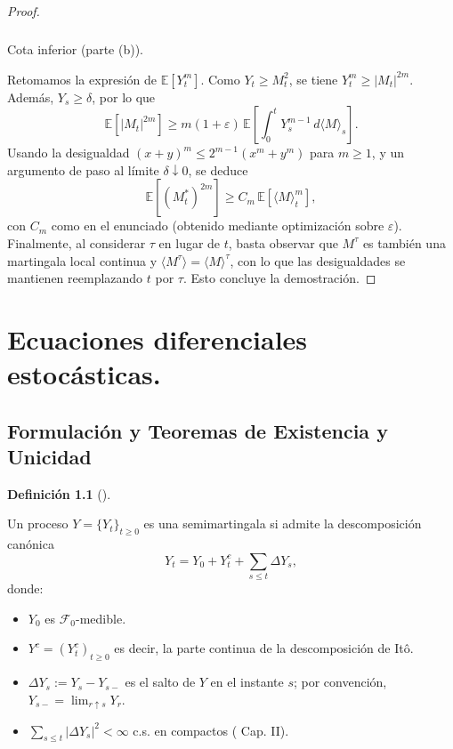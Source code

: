 \documentclass[
  spanish,
  us-letterpaper,
]{scrreprt}
\makeatletter
\let\oldparagraph\paragraph
\renewcommand{\paragraph}{
    \@ifstar
      \xxxParagraphStar
      \xxxParagraphNoStar
  }
\newcommand{\xxxParagraphStar}[1]{\oldparagraph*{#1}\mbox{}}
\newcommand{\xxxParagraphNoStar}[1]{\oldparagraph{#1}\mbox{}}
\theoremstyle{plain}
\theoremstyle{plain}
\theoremstyle{definition}
\newtheorem{definition}{Definición}[chapter]
\theoremstyle{remark}
\makeatother
\begin{document}
\begin{proof}
\paragraph{Cota inferior (parte (b)).}

Retomamos la expresión de \(\mathbb{E}[Y_t^m]\). Como
\(Y_t \geq M_t^2\), se tiene \(Y_t^m \geq |M_t|^{2m}\). Además,
\(Y_s \geq \delta\), por lo que
\[\mathbb{E}[|M_t|^{2m}] \geq m(1+\varepsilon) \, \mathbb{E}\!\left[ \int_0^t Y_s^{m-1} \, d\langle M \rangle_s \right].\]
Usando la desigualdad \((x+y)^m \leq 2^{m-1}(x^m + y^m)\) para
\(m \geq 1\), y un argumento de paso al límite \(\delta \downarrow 0\),
se deduce
\[\mathbb{E}[(M_t^*)^{2m}] \geq C_m \, \mathbb{E}[\langle M \rangle_t^m],\]
con \(C_m\) como en el enunciado (obtenido mediante optimización sobre
\(\varepsilon\)). Finalmente, al considerar \(\tau\) en lugar de \(t\),
basta observar que \(M^\tau\) es también una martingala local continua y
\(\langle M^\tau \rangle = \langle M \rangle^\tau\), con lo que las
desigualdades se mantienen reemplazando \(t\) por \(\tau\). Esto
concluye la demostración.
\end{proof}


\chapter{Ecuaciones diferenciales estocásticas.}\label{sec-EDESJs}

\section{Formulación y Teoremas de Existencia y
Unicidad}\label{formulaciuxf3n-y-teoremas-de-existencia-y-unicidad}

\begin{definition}[]\protect\hypertarget{def-Semimartingalas_saltos}{}\label{def-Semimartingalas_saltos}

Un proceso \(Y = \{Y_t\}_{t \geq 0}\) es una semimartingala si admite la
descomposición canónica
\[Y_t = Y_0 + Y_t^c + \sum_{s \leq t} \Delta Y_s,\] donde:

\begin{itemize}
\item
  \(Y_0\) es \(\mathcal{F}_0\)-medible.
\item
  \(Y^c = (Y_t^c)_{t \geq 0}\) es decir, la parte continua de la
  descomposición de Itô.
\item
  \(\Delta Y_s := Y_s - Y_{s-}\) es el salto de \(Y\) en el instante
  \(s\); por convención, \(Y_{s-} = \lim_{r \uparrow s} Y_r\).
\item
  \(\sum_{s \leq t} |{\Delta Y_s}|^2 < \infty\) c.s. en compactos (
  \textcite{protter2005stochastic} Cap. II).
\end{itemize}

\end{definition}
\end{document}
